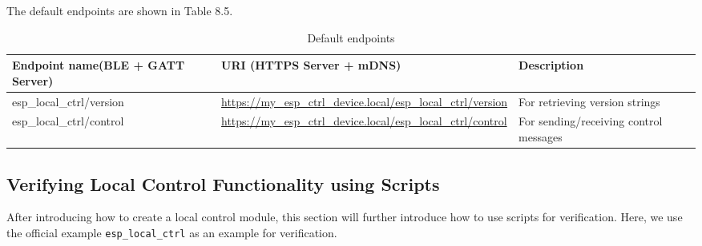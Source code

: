 \documentclass[a4paper,12pt,openany]{book}
\renewcommand{\arraystretch}{1}
\begin{document}
The default endpoints are shown in Table 8.5.

\begin{table}[h!]
    \renewcommand{\arraystretch}{1}
    \caption{Default endpoints}
    \begin{tabular}{|>{\Centering}m{10em}|>{\Centering}m{15em}|>{\Centering}m{13em}|}
        \hline
        \rowcolor{LightBlue} \textbf{Endpoint name\newline(BLE + GATT Server)}&\textbf{URI (HTTPS Server + mDNS)}&\textbf{Description}\\
        \hline
        esp\_local\_ctrl/version&\url{https://my_esp_ctrl_device.local/esp_local_ctrl/version}&For retrieving version strings\\
        \hline
        esp\_local\_ctrl/control&\url{https://my_esp_ctrl_device.local/esp_local_ctrl/control}&For sending/receiving control messages\\
        \hline
    \end{tabular}
\end{table}

\subsection{Verifying Local Control Functionality using Scripts}
After introducing how to create a local control module, this section will further introduce how to use scripts for verification. Here, we use the official example \verb|esp_local_ctrl| as an example for verification.
\end{document}
